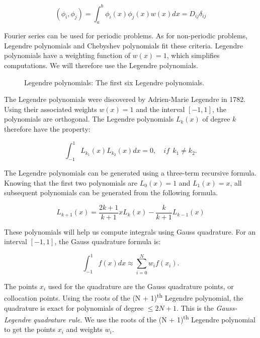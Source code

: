 \begin{equation}
	\left ( \phi_i, \phi_j \right ) = \int_a^b \phi_i(x)\phi_j(x)w(x)dx = D_{ij}\delta_{i j}
\end{equation}

Fourier series can be used for periodic problems. As for non-periodic problems, Legendre polynomials
and Chebyshev polynomials fit these criteria. Legendre polynomials have a weighting function of
$w(x) = 1$, which simplifies computations. We will therefore use the Legendre polynomials.

\begin{figure}[H]
	\centering
	
	\caption{Legendre polynomials: The first six Legendre polynomials.}
	\label{fig:polynomials}
\end{figure}

The Legendre polynomials were discovered by Adrien-Marie Legendre in 1782. Using their associated
weights $w(x) = 1$ and the interval $\left[ -1, 1 \right]$, the polynomials are orthogonal. The
Legendre polynomials $L_k \left( x \right)$ of degree $k$ therefore have the property:

\begin{equation}
	\int_{-1}^{1}L_{k_1}(x) L_{k_2}(x) dx = 0, \quad if \:\: k_1 \neq k_2.
\end{equation}

The Legendre polynomials can be generated using a three-term recursive formula. Knowing that the
first two polynomials are $L_0 \left( x \right) = 1$ and $L_1 \left( x \right) = x$, all subsequent
polynomials can be generated from the following formula.

\begin{equation} \label{equ:three_terms}
	L_{k + 1}(x) = \frac{2k + 1}{k + 1}xL_k(x) - \frac{k}{k + 1}L_{k - 1}(x)
\end{equation}

These polynomials will help us compute integrals using Gauss quadrature. For an interval $\left[ -1, 1
\right]$, the Gauss quadrature formula is:

\begin{equation}
	\int_{-1}^{1}f(x)dx \approx \sum_{i = 0}^{N}w_i f(x_i).
\end{equation}

The points $x_i$ used for the quadrature are the Gauss quadrature points, or collocation points.
Using the roots of the (N + 1)\textsuperscript{th} Legendre polynomial, the quadrature is exact for
polynomials of degree $\leq 2 N + 1$. This is the \textit{Gauss-Legendre quadrature rule}. We use
the roots of the (N + 1)\textsuperscript{th} Legendre polynomial to get the points $x_i$ and weights
$w_i$.

